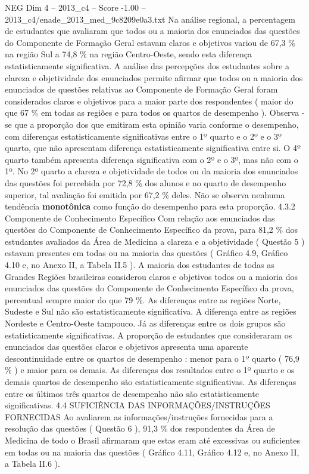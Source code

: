 \begin{textsample}{NEG Dim 4 – 2013\_c4 – Score -1.00 – 2013\_c4/enade\_2013\_med\_9c8209e0a3.txt}
Na análise regional, a percentagem de estudantes que avaliaram que todos ou a maioria dos enunciados das questões do Componente de Formação Geral estavam claros e objetivos variou de 67,3 \% na região Sul a 74,8 \% na região Centro-Oeste, sendo esta diferença estatisticamente significativa.
A análise das percepções dos estudantes sobre a clareza e objetividade dos enunciados permite afirmar que todos ou a maioria dos enunciados de questões relativas ao Componente de Formação Geral foram considerados claros e objetivos para a maior parte dos respondentes ( maior do que 67 \% em todas as regiões e para todos os quartos de desempenho ).
Observa -se que a proporção dos que emitiram esta opinião varia conforme o desempenho, com diferenças estatisticamente significativas entre o 1º quarto e o 2º e o 3º quarto, que não apresentam diferença estatisticamente significativa entre si.
O 4º quarto também apresenta diferença significativa com o 2º e o 3º, mas não com o 1º.
No 2º quarto a clareza e objetividade de todos ou da maioria dos enunciados das questões foi percebida por 72,8 \% dos alunos e no quarto de desempenho superior, tal avaliação foi emitida por 67,2 \% deles.
Não se observa nenhuma tendência \textbf{monotônica} como função do desempenho para esta proporção. 4.3.2 Componente de Conhecimento Específico Com relação aos enunciados das questões do Componente de Conhecimento Específico da prova, para 81,2 \% dos estudantes avaliados da Área de Medicina a clareza e a objetividade ( Questão 5 ) estavam presentes em todas ou na maioria das questões ( Gráfico 4.9, Gráfico 4.10 e, no Anexo II, a Tabela II.5 ).
A maioria dos estudantes de todas as Grandes Regiões brasileiras considerou claros e objetivos todos ou a maioria dos enunciados das questões do Componente de Conhecimento Específico da prova, percentual sempre maior do que 79 \%.
As diferenças entre as regiões Norte, Sudeste e Sul não são estatisticamente significativa.
A diferença entre as regiões Nordeste e Centro-Oeste tampouco.
Já as diferenças entre os dois grupos são estatisticamente significativas.
A proporção de estudantes que consideraram os enunciados das questões claros e objetivos apresenta uma aparente descontinuidade entre os quartos de desempenho : menor para o 1º quarto ( 76,9 \% ) e maior para os demais.
As diferenças dos resultados entre o 1º quarto e os demais quartos de desempenho são estatisticamente significativas.
As diferenças entre os últimos três quartos de desempenho não são estatisticamente significativas. 4.4 SUFICIÊNCIA DAS INFORMAÇÕES/INSTRUÇÕES FORNECIDAS Ao avaliarem as informações/instruções fornecidas para a resolução das questões ( Questão 6 ), 91,3 \% dos respondentes da Área de Medicina de todo o Brasil afirmaram que estas eram até excessivas ou suficientes em todas ou na maioria das questões ( Gráfico 4.11, Gráfico 4.12 e, no Anexo II, a Tabela II.6 ).

\end{textsample}
